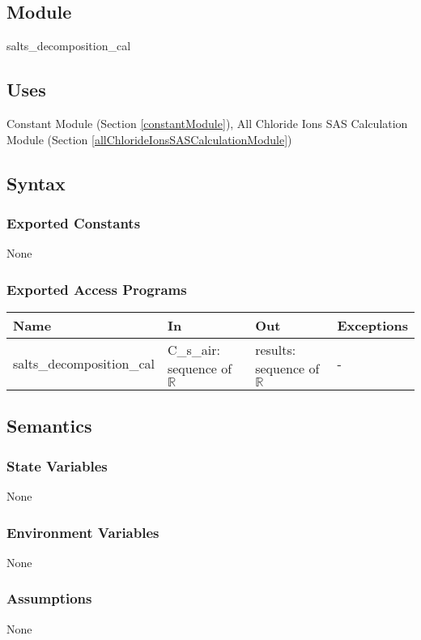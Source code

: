\documentclass[12pt, titlepage]{article}
\begin{document}
\subsection{Module}
salts\_decomposition\_cal

\subsection{Uses}

Constant Module (Section \ref{constantModule}), All Chloride Ions SAS Calculation Module (Section \ref{allChlorideIonsSASCalculationModule})

\subsection{Syntax}

\subsubsection{Exported Constants}
None
\subsubsection{Exported Access Programs}

\begin{center}
\begin{tabular}{p{4cm} p{4.5cm} p{4cm} p{2cm}}
\hline
\textbf{Name} & \textbf{In} & \textbf{Out} & \textbf{Exceptions} \\
\hline
salts\_decomposition\_cal & C\_s\_air: sequence of $\mathbb{R}$ & results: sequence of $\mathbb{R}$ & - \\

\hline
\end{tabular}
\end{center}

\subsection{Semantics}

\subsubsection{State Variables}
None

\subsubsection{Environment Variables}
None
\subsubsection{Assumptions}
None
\end{document}
